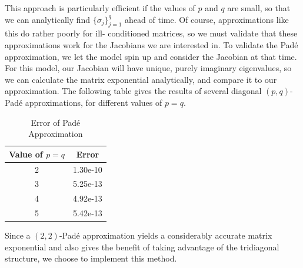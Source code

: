 \documentclass{csri19}
\begin{document}
This approach is particularly efficient if the values of $p$ and $q$ are 
small, so that we can analytically find $\{\sigma_j\}_{j=1}^q$ ahead of 
time. Of course, approximations like this do rather poorly for ill-
conditioned matrices, so we must validate that these approximations work 
for the Jacobians we are interested in. To validate the Pad\'e 
approximation, we let the model spin up and consider the Jacobian at that
time. For this model, our Jacobian will have unique, purely imaginary
eigenvalues, so we can calculate the matrix exponential analytically, and 
compare it to our approximation. The following table gives the results of
 several diagonal $(p,q)$-Pad\'e approximations, for different values of
$p=q$.
\begin{table}[ht]
  \begin{center}
    \caption{Error of Pad\'e Approximation}
    \label{CFK:tab:PadeError}
    \begin{tabular}{|c|c|}
      \hline
      \textbf{Value of $p=q$} & \textbf{Error}\\
      \hline
      2 & 1.30e-10 \\
      3 & 5.25e-13 \\
      4 & 4.92e-13 \\
      5 & 5.42e-13 \\
      \hline
    \end{tabular}
  \end{center}
\end{table}

Since a $(2,2)$-Pad\'e approximation yields a considerably accurate matrix 
exponential and also gives the benefit of taking advantage of the 
tridiagonal structure, we choose to implement this method.
\end{document}
